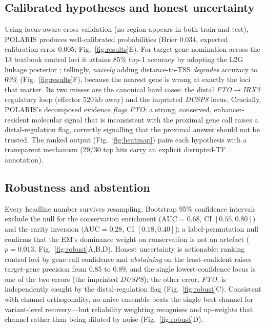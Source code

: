 \documentclass[10pt]{article}
\begin{document}
\subsection{Calibrated hypotheses and honest uncertainty}
Using locus-aware cross-validation (no region appears in both train and test), POLARIS produces
well-calibrated probabilities (Brier $0.034$, expected calibration error $0.005$;
Fig.~\ref{fig:results}E). For target-gene nomination across the 13 textbook control loci it attains
$85\%$ top-1 accuracy by adopting the L2G linkage posterior \citep{mountjoy2021l2g}; tellingly,
\emph{naively} adding distance-to-TSS \emph{degrades} accuracy to $69\%$ (Fig.~\ref{fig:results}F),
because the nearest gene is wrong at exactly the loci that matter. Its two misses are the canonical
hard cases: the distal \emph{FTO}$\rightarrow$\emph{IRX3} regulatory loop (effector $520$\,kb away) and
the imprinted \emph{DUSP8} locus. Crucially, POLARIS's decomposed evidence \emph{flags} \emph{FTO}:
a strong, conserved, enhancer-resident molecular signal that is inconsistent with the proximal gene
call raises a distal-regulation flag, correctly signalling that the proximal answer should not be
trusted. The ranked output (Fig.~\ref{fig:heatmap}) pairs each hypothesis with a transparent mechanism
(29/30 top hits carry an explicit disrupted-TF annotation).

\subsection{Robustness and abstention}
Every headline number survives resampling. Bootstrap 95\% confidence intervals exclude the null for the
conservation enrichment ($\mathrm{AUC}=0.68$, CI $[0.55,0.80]$) and the rarity inversion
($\mathrm{AUC}=0.28$, CI $[0.18,0.40]$); a label-permutation null confirms that the EM's dominance weight
on conservation is not an artefact ($p=0.013$, Fig.~\ref{fig:robust}A,B,D). Honest uncertainty is
actionable: ranking control loci by gene-call confidence and \emph{abstaining} on the least-confident
raises target-gene precision from $0.85$ to $0.89$, and the single lowest-confidence locus is one of the
two errors (the imprinted \emph{DUSP8}); the other error, \emph{FTO}, is independently caught by the
distal-regulation flag (Fig.~\ref{fig:robust}C). Consistent with channel orthogonality, no naive ensemble
beats the single best channel for variant-level recovery---but reliability weighting recognises and
up-weights that channel rather than being diluted by noise (Fig.~\ref{fig:robust}D).
\end{document}
